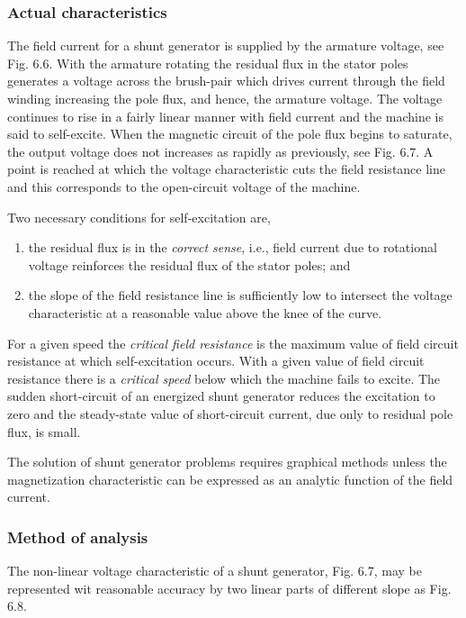 \documentclass[a4paper,numbers=noenddot,12pt]{scrbook}
\begin{document}
\subsubsection{Actual characteristics} The field current for a shunt generator is supplied by the armature voltage, see Fig. 6.6. With the armature rotating the residual flux in the stator poles generates a voltage across the brush-pair which drives current through the field winding increasing the pole flux, and hence, the armature voltage. The voltage continues to rise in a fairly linear manner with field current and the machine is said to self-excite. When the magnetic circuit of the pole flux
begins to saturate, the output voltage does not increases as rapidly as previously, see Fig. 6.7. A point is reached at which the voltage characteristic cuts the field resistance line and this corresponds to the open-circuit voltage of the machine.

Two necessary conditions for self-excitation are,
\begin{enumerate}[label={(\alph*)}]
    \item the residual flux is in the \textit{correct sense}, i.e., field current due to rotational voltage reinforces the residual flux of the stator poles; and
    \item the slope of the field resistance line is sufficiently low to intersect the voltage characteristic at a reasonable value above the knee of the curve.
\end{enumerate}
For a given speed the \textit{critical field resistance} is the maximum value of field circuit resistance at which self-excitation occurs. With a given value of field circuit resistance there is a  \textit{critical speed} below which the machine fails to excite. The sudden short-circuit of an energized shunt generator reduces the excitation to zero and the steady-state value of short-circuit current, due only to residual pole flux, is small.

The solution of shunt generator problems requires graphical methods unless the magnetization characteristic can be expressed as an analytic function of the field current.

\subsubsection{Method of analysis} The non-linear voltage characteristic of a shunt generator, Fig. 6.7, may be represented wit reasonable accuracy by two linear parts of different slope as Fig. 6.8.
\end{document}
